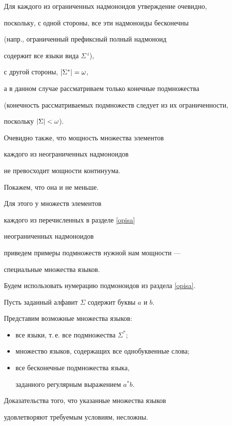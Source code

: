 \begin{pf}


 Для каждого из ограниченных надмоноидов утверждение очевидно,


 поскольку, с одной стороны, все эти надмоноиды бесконечны


 (напр., ограниченный префиксный полный надмоноид


 содержит все языки вида $\Sigma\,^i$),


с другой стороны, $|\Sigma^*|=\omega$,


 а в данном случае рассматриваем только конечные подмножества


 (конечность рассматриваемых подмножеств следует из их ограниченности,


 поскольку $|\Sigma|<\omega$).


 Очевидно также, что мощность множества элементов


 каждого из неограниченных надмоноидов


 не превосходит мощности континуума.


 Покажем, что она и не меньше.





 Для этого у множеств элементов


 каждого из перечисленных в разделе \ref{opisa}


 неограниченных надмоноидов


 приведем примеры подмножеств нужной нам мощности ---


 специальные множества языков.


 Будем использовать нумерацию подмоноидов из раздела \ref{opisa}.





 Пусть заданный алфавит $\Sigma$ содержит буквы $a$ и $b$.


Представим возможные множества языков:


 \begin{itemize}


 \item[1)] все языки, т.\,е. все подмножества $\Sigma^*$;


 \item[4, 5)] множество языков, содержащих все однобуквенные слова;


 \item[3, 8)] все бесконечные подмножества языка,


 заданного регулярным выражением $a^*b$.


 \end{itemize}


 Доказательства того, что указанные множества языков


 удовлетворяют требуемым условиям, несложны.


\end{pf}












